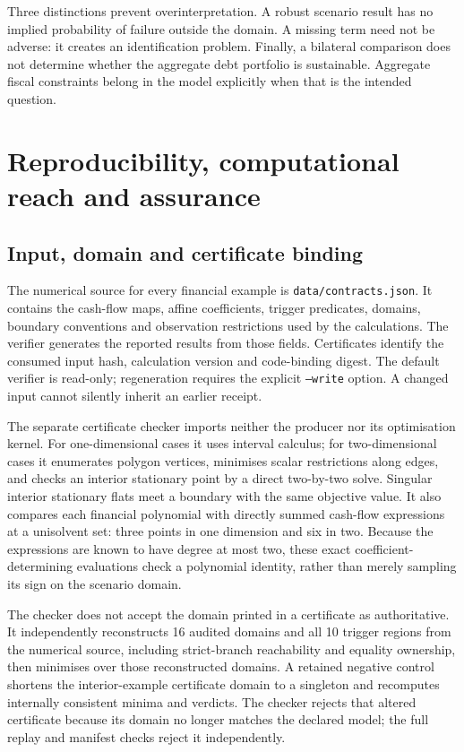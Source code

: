 \documentclass[11pt,a4paper]{article}
\begin{document}
Three distinctions prevent overinterpretation. A robust scenario result has no implied probability of failure outside the domain. A missing term need not be adverse: it creates an identification problem. Finally, a bilateral comparison does not determine whether the aggregate debt portfolio is sustainable. Aggregate fiscal constraints belong in the model explicitly when that is the intended question.

\section{Reproducibility, computational reach and assurance}\label{sec:assurance}
\subsection{Input, domain and certificate binding}
The numerical source for every financial example is \texttt{data/contracts.json}. It contains the cash-flow maps, affine coefficients, trigger predicates, domains, boundary conventions and observation restrictions used by the calculations. The verifier generates the reported results from those fields. Certificates identify the consumed input hash, calculation version and code-binding digest. The default verifier is read-only; regeneration requires the explicit \texttt{--write} option. A changed input cannot silently inherit an earlier receipt.

The separate certificate checker imports neither the producer nor its optimisation kernel. For one-dimensional cases it uses interval calculus; for two-dimensional cases it enumerates polygon vertices, minimises scalar restrictions along edges, and checks an interior stationary point by a direct two-by-two solve. Singular interior stationary flats meet a boundary with the same objective value. It also compares each financial polynomial with directly summed cash-flow expressions at a unisolvent set: three points in one dimension and six in two. Because the expressions are known to have degree at most two, these exact coefficient-determining evaluations check a polynomial identity, rather than merely sampling its sign on the scenario domain.

The checker does not accept the domain printed in a certificate as authoritative. It independently reconstructs 16 audited domains and all 10 trigger regions from the numerical source, including strict-branch reachability and equality ownership, then minimises over those reconstructed domains. A retained negative control shortens the interior-example certificate domain to a singleton and recomputes internally consistent minima and verdicts. The checker rejects that altered certificate because its domain no longer matches the declared model; the full replay and manifest checks reject it independently.
\end{document}

